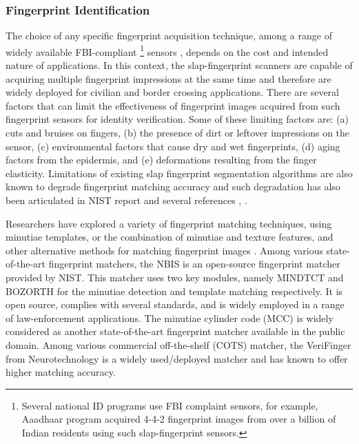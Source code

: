 \subsubsection{Fingerprint Identification\label{realate-work-fp}}
The choice of any specific fingerprint acquisition technique, among a range of widely available FBI-compliant \footnote[1]{Several national ID programs use FBI complaint sensors, for example, Aaadhaar program acquired 4-4-2 fingerprint images from over a billion of Indian residents using such \cite{fbi-sensor} slap-fingerprint sensors.} sensors \cite{fbi-sensor}, depends on the cost and intended nature of applications. In this context, the slap-fingerprint scanners are capable of acquiring multiple fingerprint impressions at the same time and therefore are widely deployed for civilian and border crossing applications. There are several factors that can limit the effectiveness of ﬁngerprint images acquired from such fingerprint sensors for identity verification. Some of these limiting factors are: (a) cuts and bruises on ﬁngers, (b) the presence of dirt or leftover impressions on the sensor, (c) environmental factors that cause dry and wet fingerprints, (d) aging factors from the epidermis, and (e) deformations resulting from the finger elasticity. Limitations of existing slap fingerprint segmentation algorithms are also known to degrade fingerprint matching accuracy and such degradation has also been articulated in NIST report \cite{watson2009slapssegii} and several references \cite{maltoni2009handbook}, \cite{zhang2010slap}.

Researchers have explored a variety of fingerprint matching techniques, using minutiae templates, or the combination of minutiae and texture features, and other alternative methods for matching fingerprint images \cite{maltoni2009handbook}. Among various state-of-the-art fingerprint matchers, the NBIS \cite{watson2007user} is an open-source fingerprint matcher provided by NIST. This matcher uses two key modules, namely MINDTCT and BOZORTH for the minutiae detection and template matching respectively. It is open source, complies with several standards, and is widely employed in a range of law-enforcement applications. The minutiae cylinder code (MCC) \cite{cappelli2010minutia} is widely considered as another state-of-the-art fingerprint matcher available in the public domain. Among various commercial off-the-shelf (COTS) matcher, the VeriFinger from Neurotechnology \cite{verifinger} is a widely used/deployed matcher and has known to offer higher matching accuracy. 


